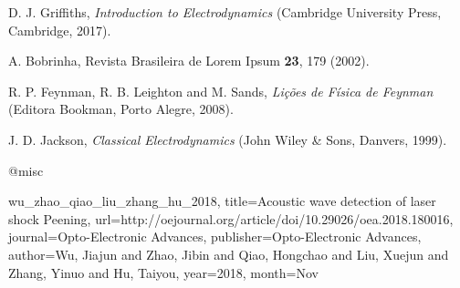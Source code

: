 \begin{thebibliography}{4}
D. J. Griffiths,
\textit{Introduction to Electrodynamics}
(Cambridge University Press, Cambridge, 2017).

A. Bobrinha,
Revista Brasileira de Lorem Ipsum \textbf{23},
179 (2002).

R. P. Feynman, R. B. Leighton and M. Sands,
\textit{Lições de Física de Feynman}
(Editora Bookman, Porto Alegre, 2008).

J. D. Jackson,
\textit{Classical Electrodynamics}
(John Wiley \& Sons, Danvers, 1999).

  @misc{wu_zhao_qiao_liu_zhang_hu_2018, title={Acoustic wave detection of laser shock Peening}, url={http://oejournal.org/article/doi/10.29026/oea.2018.180016},
  journal={Opto-Electronic Advances}, publisher={Opto-Electronic Advances},
  author={Wu, Jiajun and Zhao, Jibin and Qiao, Hongchao and Liu, Xuejun and Zhang, Yinuo and Hu, Taiyou}, 
  year={2018},
  month={Nov}
  
} 

\end{thebibliography}


